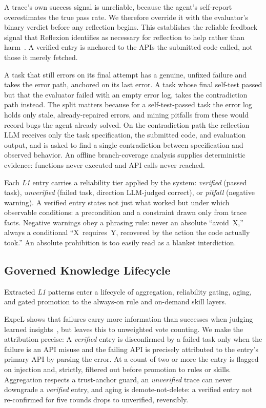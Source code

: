 \documentclass[conference]{IEEEtran}
\begin{document}
A trace's own success signal is unreliable, because the agent's self-report overestimates the true pass rate. We therefore override it with the evaluator's binary verdict before any reflection begins. This establishes the reliable feedback signal that Reflexion identifies as necessary for reflection to help rather than harm~\cite{shinn2023reflexion}. A verified entry is anchored to the APIs the submitted code called, not those it merely fetched.

A task that still errors on its final attempt has a genuine, unfixed failure and takes the error path, anchored on its last error. A task whose final self-test passed but that the evaluator failed with an empty error log, takes the contradiction path instead. The split matters because for a self-test-passed task the error log holds only stale, already-repaired errors, and mining pitfalls from these would record bugs the agent already solved. On the contradiction path the reflection LLM receives only the task specification, the submitted code, and evaluation output, and is asked to find a single contradiction between specification and observed behavior. An offline branch-coverage analysis supplies deterministic evidence: functions never executed and API calls never reached.

Each \emph{L1} entry carries a reliability tier applied by the system: \emph{verified} (passed task), \emph{unverified} (failed task, direction LLM-judged correct), or \emph{pitfall} (negative warning). A verified entry states not just what worked but under which observable conditions: a precondition and a constraint drawn only from trace facts. Negative warnings obey a phrasing rule: never an absolute ``avoid~X,'' always a conditional ``X~requires~Y, recovered by the action the code actually took.'' An absolute prohibition is too easily read as a blanket interdiction.

\subsection{Governed Knowledge Lifecycle}
\label{sec:se_govern}

Extracted \emph{L1} patterns enter a lifecycle of aggregation, reliability gating, aging, and gated promotion to the always-on rule and on-demand skill layers.

ExpeL shows that failures carry more information than successes when judging learned insights~\cite{zhao2024expel}, but leaves this to unweighted vote counting. We make the attribution precise: A \emph{verified} entry is disconfirmed by a failed task only when the failure is an API misuse and the failing API is precisely attributed to the entry's primary API by parsing the error. At a count of two or more the entry is flagged on injection and, strictly, filtered out before promotion to rules or skills. Aggregation respects a trust-anchor guard, an \emph{unverified} trace can never downgrade a \emph{verified} entry, and aging is demote-not-delete: a verified entry not re-confirmed for five rounds drops to unverified, reversibly.
\end{document}
